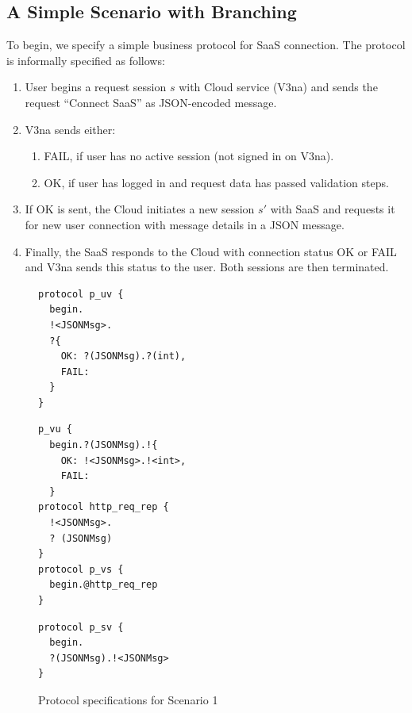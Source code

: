 \documentclass[10pt]{llncs}
\begin{document}
\subsection{A Simple Scenario with Branching}
To begin, we specify a simple business protocol for SaaS connection. The protocol is informally specified as follows:
\begin{enumerate}
\item  User begins a request session $s$ with Cloud service (V3na) and sends the request ``Connect SaaS'' as JSON-encoded message.
\item  V3na sends either:
\begin{enumerate}
\item  FAIL, if user has no active session (not signed in on V3na). %
\item  OK, if user has logged in and request data has passed validation steps. %
\end{enumerate}
\item  If OK is sent, the Cloud initiates a new session $s'$ with SaaS and requests it for new user connection with message details in a JSON message.
\item Finally, the SaaS responds to the Cloud with connection status OK or FAIL and V3na sends this status to the user. Both sessions are then terminated.
\end{enumerate}

%
{
\lstset{
  framerule=0pt,
  numbers=none,
  basicstyle=\ttfamily\scriptsize,
}
\renewcommand\lstlistingname{Protocol}
\begin{figure}

\begin{minipage}[t]{0.30\textwidth}
\begin{lstlisting}[caption=User]
protocol p_uv { 
  begin.
  !<JSONMsg>. 
  ?{
    OK: ?(JSONMsg).?(int),
    FAIL: 
  }
}
\end{lstlisting}
\end{minipage}
\begin{minipage}[t]{0.35\textwidth}
\begin{lstlisting}[caption=Cloud]
p_vu { 
  begin.?(JSONMsg).!{
    OK: !<JSONMsg>.!<int>,
    FAIL: 
  }
protocol http_req_rep {
  !<JSONMsg>.
  ? (JSONMsg)
}
protocol p_vs { 
  begin.@http_req_rep 
}
\end{lstlisting}
\end{minipage}
\begin{minipage}[t]{0.30\textwidth}
\begin{lstlisting}[caption=SaaS]
protocol p_sv { 
  begin.
  ?(JSONMsg).!<JSONMsg> 
}
\end{lstlisting}
\end{minipage}
\caption{Protocol specifications for Scenario 1}\label{fig:protocols-sc1} 
\end{figure}
}
\end{document}
